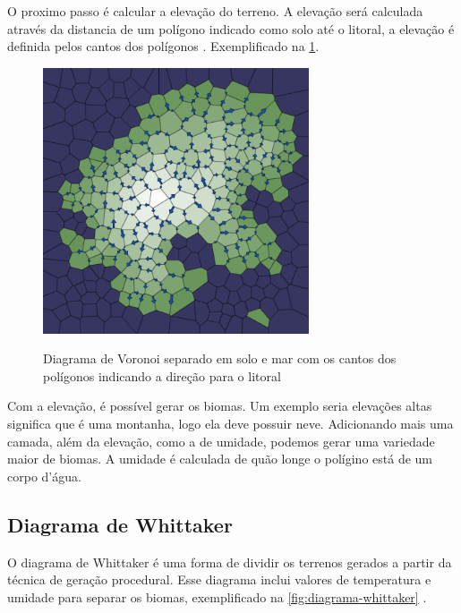 O proximo passo é calcular a elevação do terreno. A elevação será calculada através da distancia de um polígono indicado como solo até o litoral, a elevação é definida pelos cantos dos polígonos \space\cite{amitp2010}. Exemplificado na \cref{fig:downslopes}.

\begin{figure}[ht]
	\caption{Diagrama de Voronoi separado em solo e mar com os cantos dos polígonos indicando a direção para o litoral}
	\centering
	\includegraphics[width=0.7\textwidth]{figures/downslopes.png}
	\label{fig:downslopes}
\end{figure}

Com a elevação, é possível gerar os biomas. Um exemplo seria elevações altas significa que é uma montanha, logo ela deve possuir neve. Adicionando mais uma camada, além da elevação, como a de umidade, podemos gerar uma variedade maior de biomas. A umidade é calculada de quão longe o polígino está de um corpo d'água.

\subsection*{Diagrama de Whittaker}

O diagrama de Whittaker é uma forma de dividir os terrenos gerados a partir da técnica de geração procedural. Esse diagrama inclui valores de temperatura e umidade para separar os biomas, exemplificado na \cref{fig:diagrama-whittaker} \space\cite{wikidotwhittakerdiagram}.

